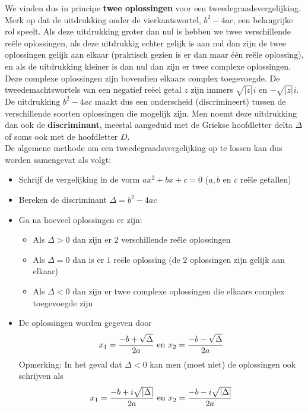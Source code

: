 We vinden dus in principe {\bf twee oplossingen} voor een tweedegraadsvergelijking.\\
Merk op dat de uitdrukking onder de vierkantswortel, $b^2 - 4ac$, een belangrijke rol speelt. Als deze uitdrukking groter dan nul is hebben we twee verschillende re\"{e}le oplossingen, als deze uitdrukkig echter gelijk is aan nul dan zijn de twee oplossingen gelijk aan elkaar (praktisch gezien is er dan maar \'{e}\'{e}n  re\"{e}le oplossing), en als de uitdrukking kleiner is dan nul dan zijn er twee complexe oplossingen. Deze complexe oplossingen zijn bovendien elkaars complex toegevoegde. De tweedemachtswortels van een negatief re\"{e}el getal $z$ zijn immers $\sqrt{|z|}i$ en $-\sqrt{|z|}i$.\\
De uitdrukking $b^2 - 4ac$ maakt dus een onderscheid (discrimineert) tussen de verschillende soorten oplossingen die mogelijk zijn. Men noemt deze uitdrukking dan ook de {\bf discriminant}, meestal aangeduid met de Griekse hoofdletter delta $\Delta$ of soms ook met de hoofdletter $D$.\\

De algemene methode om een tweedegraadsvergelijking op te lossen kan dus worden samengevat als volgt:\\

\begin{framed}
\begin{itemize}
\item Schrijf de vergelijking in de vorm $ax^2 + bx + c = 0$     ($a,b$ en $c$ re\"{e}le getallen)
\item Bereken de discriminant $\Delta = b^2 - 4ac$
\item Ga na hoeveel oplossingen er zijn:
        \begin{itemize} \item Als $\Delta >0$ dan zijn er $2$ verschillende re\"{e}le oplossingen \item Als $\Delta=0$ dan is er $1$ re\"{e}le oplossing (de $2$ oplossingen zijn gelijk aan elkaar) \item Als $\Delta <0$ dan zijn er twee complexe oplossingen die elkaars complex toegevoegde zijn \end{itemize}
\item De oplossingen worden gegeven door
\[ x_{1}=\frac{-b + \sqrt{\Delta}}{2a} \textup{  en  } x_{2}=\frac{-b - \sqrt{\Delta}}{2a} \]
Opmerking: In het geval dat $\Delta <0$ kan men (moet niet) de oplossingen ook schrijven als
\[ x_{1}=\frac{-b +i \sqrt{|\Delta|}}{2a} \textup{  en  } x_{2}=\frac{-b -i \sqrt{|\Delta|}}{2a} \]
\end{itemize}
\end{framed}

